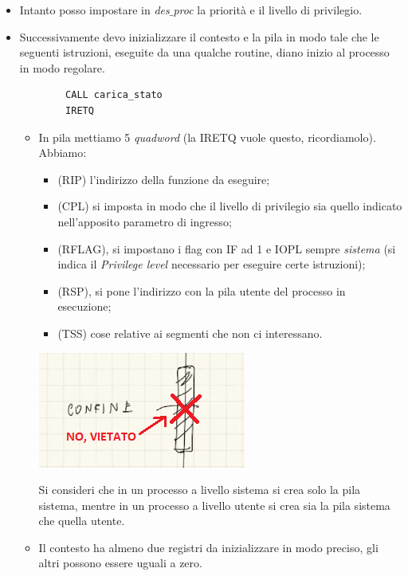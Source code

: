 \documentclass[11pt]{report}
\theoremstyle{definition}
\begin{document}
\begin{itemize}
	\item Intanto posso impostare in \emph{des$\_$proc} la priorità e il livello di privilegio.
	\item Successivamente devo inizializzare il contesto e la pila in modo tale che le seguenti istruzioni, eseguite da una qualche routine, diano inizio al processo in modo regolare.
	\begin{verbatim}
		CALL carica_stato
		IRETQ
	\end{verbatim}
	\begin{itemize}
		\item In pila mettiamo 5 \emph{quadword} (la IRETQ vuole questo, ricordiamolo). Abbiamo:
		\begin{multicols}{2}
		\begin{itemize}
			\item (RIP) l'indirizzo della funzione da eseguire;
			\item (CPL) si imposta in modo che il livello di privilegio sia quello indicato nell'apposito parametro di ingresso;
			\item (RFLAG), si impostano i flag con IF ad 1 e IOPL sempre \textit{sistema} (si indica il \emph{Privilege level} necessario per eseguire certe istruzioni);
			\item (RSP), si pone l'indirizzo con la pila utente del processo in esecuzione;
			\item (TSS) cose relative ai segmenti che non ci interessano.
		\end{itemize}
		\columnbreak
		\begin{center}
			\includegraphics[scale=.8]{img/283.PNG}
		\end{center}
		\end{multicols}
		Si consideri che in un processo a livello sistema si crea solo la pila sistema, mentre in un processo a livello utente si crea sia la pila sistema che quella utente.
		\item Il contesto ha almeno due registri da inizializzare in modo preciso, gli altri possono essere uguali a zero.
		\begin{itemize}

\end{itemize}
\end{itemize}
\end{itemize}
\end{document}
